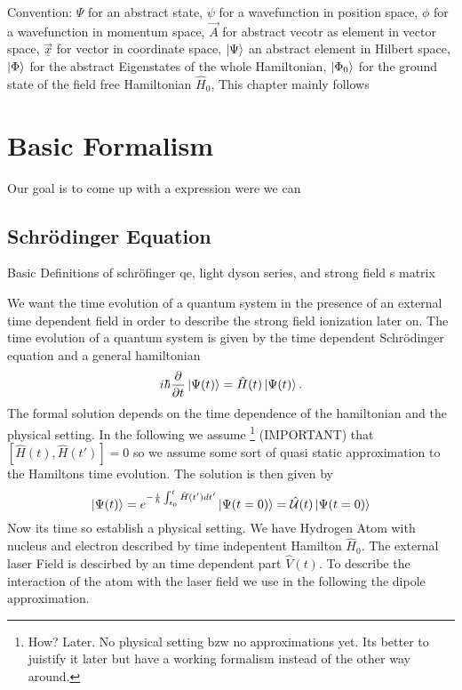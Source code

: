 Convention: $\Psi$ for an abstract state, $\psi$ for a wavefunction in position space, 
$\phi$  for a wavefunction in momentum space, 
$\vec{A}$ for abstract vecotr as element in vector space, 
$\underline{\vec{x}}$ for vector in coordinate space, 
$\ket{\Psi}$ an abstract element in Hilbert space, 
$\ket{\Phi}$ for the abstract Eigenstates of the whole Hamiltonian, 
$\ket{\Phi_0}$ for the ground state of the field free Hamiltonian $\hat{H}_0$, 
This chapter mainly follows \cite{Ivanov20012005} 



\section{Basic Formalism}
Our goal is to come up with a expression were we can 


\subsection{Schrödinger Equation}

Basic Definitions of schröfinger qe, light dyson series, and strong field s matrix

We want the time evolution of a quantum system in the presence of an external time dependent field in order to describe the strong field ionization later on.
The time evolution of a quantum system is given by the time dependent Schrödinger equation and a general hamiltonian
\begin{equation}
    i \hbar \frac{\partial}{\partial t} \ket{\Psi(t)} = \hat{H}(t) \ket{\Psi(t)}. \label{eq:schroedinger}
\end{equation}
The formal solution depends on the time dependence of the hamiltonian and the physical setting. 
In the following we assume \footnote{How? Later. No physical setting bzw no approximations yet. Its better to juistify it later but have a working formalism instead of the other way around.} (IMPORTANT) that $[\hat{H}(t), \hat{H}(t')] = 0$ so we assume some sort of quasi static approximation to the Hamiltons time evolution. 
The solution is then given by 
\begin{equation}
    \ket{\Psi(t)} = e^{-\frac{i}{\hbar} \int_{t_0}^{t} \hat{H}(t') dt'} \ket{\Psi(t=0)} = \hat{\mathcal{U}}(t)\ket{\Psi(t=0)}
\end{equation}
Now its time so establish a physical setting. We have Hydrogen Atom with nucleus and electron described by time indepentent Hamilton $\hat{H}_0$. 
The external laser Field is descirbed by an time dependent part $\hat{V}(t)$. To describe the interaction of the atom with the laser field we use in the following the dipole approximation.




